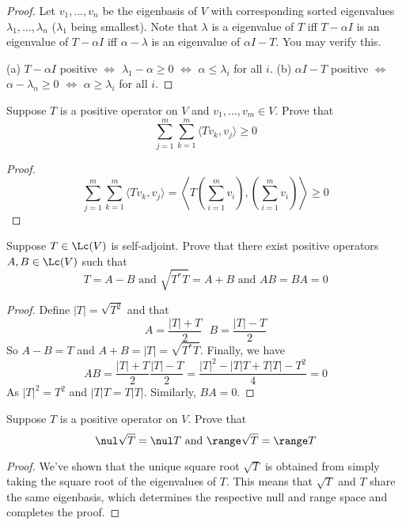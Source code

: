 \documentclass{extarticle}
\begin{document}
\begin{proof}
Let \(v_1, \ldots, v_n\) be the eigenbasis of \(V\) with corresponding sorted eigenvalues \(\lambda_1,
\ldots, \lambda_n\) (\(\lambda_1\) being smallest). Note that \(\lambda\) is a eigenvalue of \(T\) iff \(T- \alpha I\) is
an eigenvalue of \(T - \alpha I\) iff \(\alpha - \lambda\) is an eigenvalue of \(\alpha I - T\). You
may verify this.

(a) \(T - \alpha I\) positive \(\Longleftrightarrow\) \(\lambda_1 - \alpha \geq 0\)
\(\Longleftrightarrow\) \(\alpha \leq \lambda_i\) for all \(i\).
(b) \(\alpha I  -T\) positive \(\Longleftrightarrow\) \(\alpha - \lambda_n \geq 0\)
\(\Longleftrightarrow\) \(\alpha \geq \lambda_i\) for all \(i\).
\end{proof}

\begin{problem}{14}
    Suppose \(T\) is a positive operator on \(V\) and \(v_1, \ldots, v_m \in V\). Prove that
    \[\sum_{j=1}^{m} \sum_{k=1}^{m} \langle Tv_k,v_j \rangle \geq 0\]
\end{problem}

\begin{proof}
\[\sum_{j=1}^{m} \sum_{k=1}^{m} \langle Tv_k,v_j \rangle
= \left\langle T\left(\sum_{i=1}^{m} v_i \right), \left(\sum_{i=1}^{m} v_i \right) \right\rangle \geq 0\]
\end{proof}

\begin{problem}{15}
    Suppose \(T \in \Lc(V)\) is self-adjoint. Prove that there exist positive operators \(A, B
    \in \Lc(V)\) such that
    \[T = A - B \text{ and } \sqrt{T^* T} = A + B \text{ and } AB = BA = 0\]
\end{problem}

\begin{proof}
Define \(|T| = \sqrt{T^2}\) and that
\[A = \frac{|T| + T}{2} \ \ \ B = \frac{|T| - T}{2}\]
So \(A - B = T\) and \(A+B = |T| = \sqrt{T^* T}\). Finally, we have
\[AB = \frac{|T| + T}{2} \frac{|T| - T}{2} = \frac{|T|^2 - |T|T + T|T| - T^2}{4} = 0\]
As \(|T|^2 = T^2\) and \(|T|T = T|T|\). Similarly, \(BA = 0\).
\end{proof}

\begin{problem}{16}
    Suppose \(T\) is a positive operator on \(V\). Prove that
    \[\nul \sqrt{T} = \nul T \text{  and  } \range \sqrt{T} = \range T\]
\end{problem}

\begin{proof}
We've shown that the unique square root \(\sqrt{T}\) is obtained from simply taking the square root
of the eigenvalues of \(T\). This means that \(\sqrt{T}\) and \(T\) share the same eigenbasis, which
determines the respective null and range space and completes the proof.
\end{proof}
\end{document}

